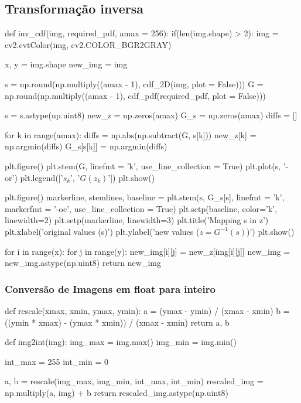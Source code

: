 \documentclass{article}
\begin{document}
\subsection{Transformação inversa}
\label{cod:inv_t}
\begin{python}
def inv_cdf(img, required_pdf, amax = 256):
	if(len(img.shape) > 2):
		img = cv2.cvtColor(img, cv2.COLOR_BGR2GRAY)
		
	x, y = img.shape
	new_img = img
	
	s = np.round(np.multiply((amax - 1), cdf_2D(img, plot = False)))
	G = np.round(np.multiply((amax - 1), cdf_pdf(required_pdf, plot = False)))
	
	s = s.astype(np.uint8)
	new_z = np.zeros(amax)
	G_s = np.zeros(amax)
	diffs = []
	
	for k in range(amax):
		diffs = np.abs(np.subtract(G, s[k]))
		new_z[k] = np.argmin(diffs)
		G_s[s[k]] = np.argmin(diffs)
	
	plt.figure()
	plt.stem(G, linefmt = 'k', use_line_collection = True)
	plt.plot(s, '-or')
	plt.legend(['$s_k$', '$G(z_k)$'])
	plt.show()
	
	plt.figure()
	markerline, stemlines, baseline = plt.stem(s, G_s[s], linefmt = 'k', markerfmt = '-oc', use_line_collection = True)
	plt.setp(baseline, color='k', linewidth=2)
	plt.setp(markerline, linewidth=3)
	plt.title('Mapping s in z')
	plt.xlabel('original values (s)')
	plt.ylabel('new values ($z = G^{-1}(s)$)')
	plt.show()
	
	for i in range(x):
		for j in range(y):
			new_img[i][j] = new_z[img[i][j]]
	new_img = new_img.astype(np.uint8)
return new_img
\end{python}

\newpage
\subsubsection{Conversão de Imagens em float para inteiro}
\label{cod:linear}
\begin{python}
def rescale(xmax, xmin, ymax, ymin):
	a = (ymax - ymin) / (xmax - xmin)
	b = ((ymin * xmax) - (ymax * xmin)) / (xmax - xmin) 
	return a, b

def img2int(img):
	img_max = img.max()
	img_min = img.min()
	
	int_max = 255
	int_min = 0
	
	a, b = rescale(img_max, img_min, int_max, int_min)
	rescaled_img = np.multiply(a, img) + b
	return rescaled_img.astype(np.uint8)
\end{python}
\end{document}
